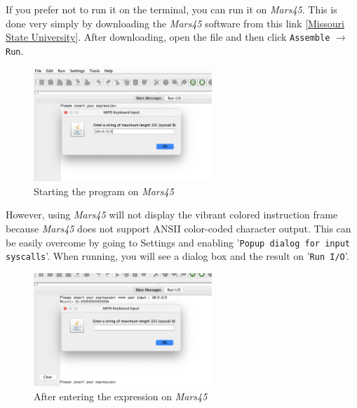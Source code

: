     If you prefer not to run it on the terminal, you can run it on \textit{Mars45}. This is done very simply by downloading the \textit{Mars45} software from this link [\href{https://courses.missouristate.edu/kenvollmar/mars/download.htm}{Missouri State University}]. After downloading, open the file and then click \texttt{Assemble} \(\rightarrow\) \texttt{Run}.

    \begin{figure}[htbp]
        \centering
        \includegraphics[width=0.6\textwidth]{graphics/1.Mars45Enter.png}
        \caption{Starting the program on \textit{Mars45}}
        \label{fig:1.MarsEnter}
    \end{figure}

    However, using \textit{Mars45} will not display the vibrant colored instruction frame because \textit{Mars45} does not support ANSII color-coded character output. This can be easily overcome by going to Settings and enabling '\texttt{Popup dialog for input syscalls}'. When running, you will see a dialog box and the result on '\texttt{Run I/O}'.

    \begin{figure}[htbp]
        \centering
        \includegraphics[width=0.6\textwidth]{graphics/1.Mars45Output.png}
        \caption{After entering the expression on \textit{Mars45}}
        \label{fig:1.MarsOutput}
    \end{figure}